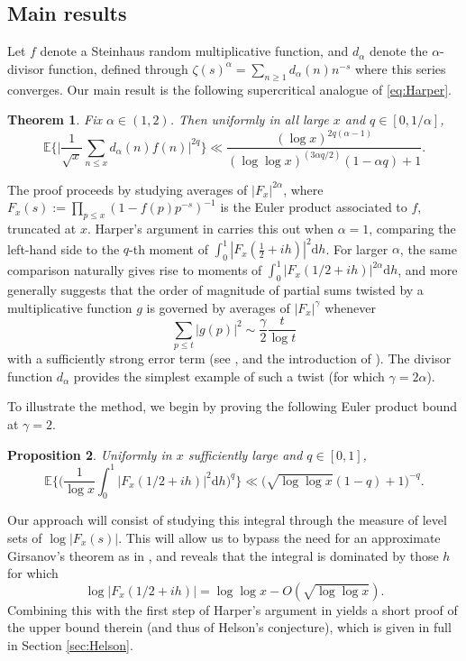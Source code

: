 \documentclass{amsart}
\newtheorem{theorem}{Theorem}[section]
\newtheorem{proposition}[theorem]{Proposition}
\theoremstyle{definition}
\theoremstyle{remark}
\numberwithin{equation}{section}
\begin{document}
\subsection{Main results} Let $f$ denote a Steinhaus random multiplicative function, and $d_\alpha$ denote the $\alpha$-divisor function, defined through $\zeta(s)^\alpha=\sum_{n\geq 1}d_\alpha(n)n^{-s}$ where this series converges. Our main result is the following supercritical analogue of \eqref{eq:Harper}.

\begin{theorem}\label{thm:main} Fix $\alpha\in (1,2)$. Then uniformly in all large $x$ and $q\in [0,1/\alpha]$,
\[
    \mathbb{E}\bigg\{\Big|\frac{1}{\sqrt{x}}\sum_{n\leq x} d_\alpha(n)f(n)\Big|^{2q}\bigg\}\ll \frac{(\log x)^{2q(\alpha-1)}}{(\log\log x)^{(3\alpha q/2)}(1-\alpha q)+1}.
\]
\end{theorem}

\noindent The proof proceeds by studying averages of $|F_x|^{2\alpha}$, where $F_x(s):=\prod_{p\leq x}(1-f(p)p^{-s})^{-1}$ is the Euler product associated to $f$, truncated at $x$. Harper's argument in \cite{HarperRMF} carries this out when $\alpha=1$, comparing the left-hand side to the $q$-th moment of $\int_0^1|F_x(\tfrac{1}{2}+ih)|^2\mathrm{d}h$. For larger $\alpha$, the same comparison naturally gives rise to moments of $\int_0^1|F_x(1/2+ih)|^{2\alpha}\mathrm{d}h$, and more generally suggests that the order of magnitude of partial sums twisted by a multiplicative function 
$g$ is governed by averages of $|F_x|^{\gamma}$  whenever
\begin{equation}\label{eq:growth}
        \sum_{p\leq t} |g(p)|^2 \sim \frac{\gamma}{2}\frac{t}{\log t}
\end{equation}
with a sufficiently strong error term (see \cite{Gerspach}, and the introduction of \cite{OfirMoDick1}). The divisor function $d_\alpha$
  provides the simplest example of such a twist (for which $\gamma=2\alpha$).


To illustrate the method, we begin by proving the following Euler product bound at $\gamma=2$.
\begin{proposition}\label{prop:2bound} Uniformly in $x$ sufficiently large and $q\in [0,1]$,
\begin{equation}\label{eq:2bound}
    \mathbb{E}\bigg\{\bigg(\frac{1}{\log x}\int_{0}^1 \big|F_x(1/2+ih)\big|^2\mathrm{d}h\bigg)^q\bigg\}\ll \big({\sqrt{\log\log x}(1-q)+1}\big)^{-q}.
\end{equation}
\end{proposition}
\noindent Our approach will consist of studying this integral through the measure of level sets of $\log |F_x(s)|$. This will allow us to bypass the need for an approximate Girsanov's theorem as in \cite{HarperRMF}, and reveals that the integral is dominated by those $h$ for which $$\log|F_x(1/2+ih)|=\log \log x-O(\sqrt{\log\log x}).$$ Combining this with the first step of Harper's argument in \cite{HarperRMF} yields a short proof of the upper bound therein (and thus of Helson's conjecture), which is given in full in Section \ref{sec:Helson}.
\end{document}
